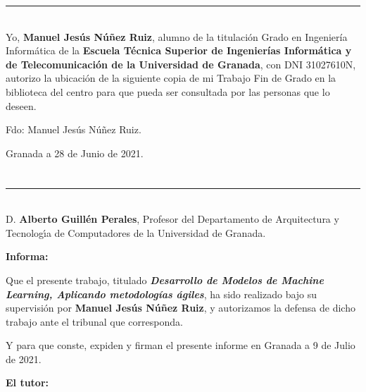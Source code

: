 \noindent\rule[-1ex]{\textwidth}{2pt}\\[4.5ex]

Yo, \textbf{Manuel Jesús Núñez Ruiz}, alumno de la titulación Grado en Ingeniería Informática de la \textbf{Escuela Técnica Superior
de Ingenierías Informática y de Telecomunicación de la Universidad de Granada}, con DNI 31027610N, autorizo la
ubicación de la siguiente copia de mi Trabajo Fin de Grado en la biblioteca del centro para que pueda ser
consultada por las personas que lo deseen.

\vspace{6cm}

\noindent Fdo: Manuel Jesús Núñez Ruiz.

\vspace{2cm}

\begin{flushright}
Granada a 28 de Junio de 2021.
\end{flushright}


\chapter*{}
\thispagestyle{empty}

\noindent\rule[-1ex]{\textwidth}{2pt}\\[4.5ex]

D. \textbf{Alberto Guillén Perales}, Profesor del Departamento de Arquitectura y Tecnologı́a de Computadores de la Universidad de Granada.


\vspace{0.5cm}

\textbf{Informa:}

\vspace{0.5cm}

Que el presente trabajo, titulado \textit{\textbf{Desarrollo de Modelos de Machine Learning, Aplicando metodologías ágiles}},
ha sido realizado bajo su supervisión por \textbf{Manuel Jesús Núñez Ruiz}, y autorizamos la defensa de dicho trabajo ante el tribunal
que corresponda.

\vspace{0.5cm}

Y para que conste, expiden y firman el presente informe en Granada a 9 de Julio de 2021.

\vspace{1cm}

\textbf{El tutor:}

\vspace{5cm}

